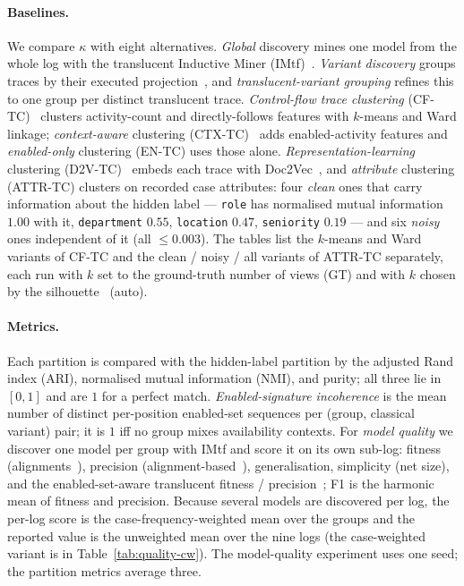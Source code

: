 \documentclass[10pt]{article}
\begin{document}
\begin{table}[t]
  \centering
  \caption{The nine synthetic logs and the phenomenon each isolates (group headers).
  Right of the rule is a result: $\kappa$ produces exactly hidden-$k$ views on every log except the rework loop.}
  \label{tab:logs}
  \small\setlength{\tabcolsep}{4pt}
  
\end{table}

\paragraph{Baselines.}
We compare $\kappa$ with eight alternatives.
\emph{Global} discovery mines one model from the whole log with the translucent Inductive Miner (IMtf)~\cite{beyel2024tar}.
\emph{Variant discovery} groups traces by their executed projection~\cite{greco2006,garciabanuelos2014}, and \emph{translucent-variant grouping} refines this to one group per distinct translucent trace.
\emph{Control-flow trace clustering} (CF-TC)~\cite{song2008} clusters activity-count and directly-follows features with $k$-means and Ward linkage; \emph{context-aware} clustering (CTX-TC)~\cite{bose2009} adds enabled-activity features and \emph{enabled-only} clustering (EN-TC) uses those alone.
\emph{Representation-learning} clustering (D2V-TC)~\cite{dekoninck2018} embeds each trace with Doc2Vec~\cite{lemikolov2014}, and \emph{attribute} clustering (ATTR-TC) clusters on recorded case attributes: four \emph{clean} ones that carry information about the hidden label --- \texttt{role} has normalised mutual information $1.00$ with it, \texttt{department} $0.55$, \texttt{location} $0.47$, \texttt{seniority} $0.19$ --- and six \emph{noisy} ones independent of it (all $\le 0.003$).
The tables list the $k$-means and Ward variants of CF-TC and the clean / noisy / all variants of ATTR-TC separately, each run with $k$ set to the ground-truth number of views (GT) and with $k$ chosen by the silhouette~\cite{rousseeuw1987} (auto).

\paragraph{Metrics.}
Each partition is compared with the hidden-label partition by the adjusted Rand index (ARI), normalised mutual information (NMI), and purity; all three lie in $[0,1]$ and are $1$ for a perfect match.
\emph{Enabled-signature incoherence} is the mean number of distinct per-position enabled-set sequences per (group, classical variant) pair; it is $1$ iff no group mixes availability contexts.
For \emph{model quality} we discover one model per group with IMtf and score it on its own sub-log: fitness (alignments~\cite{adriansyah2014}), precision (alignment-based~\cite{carmona2018}), generalisation, simplicity (net size), and the enabled-set-aware translucent fitness / precision~\cite{beyel2024tp,beyel2025ta}; F1 is the harmonic mean of fitness and precision.
Because several models are discovered per log, the per-log score is the case-frequency-weighted mean over the groups and the reported value is the unweighted mean over the nine logs (the case-weighted variant is in Table~\ref{tab:quality-cw}).
The model-quality experiment uses one seed; the partition metrics average three.
\end{document}
